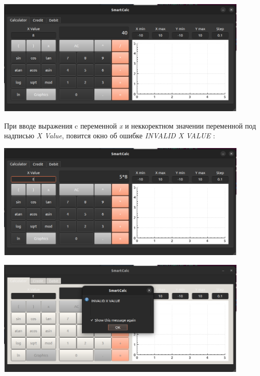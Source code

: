 \documentclass[12pt, letterpaper, twoside]{article}
\begin{document}
	\par \includegraphics[width=12cm]{9}
	
	\par При вводе выражения c переменной \textit{x} и неккоректном значении переменной под надписью \textit{X Value}, повится окно об ошибке \textit{INVALID X VALUE} :
	\par \includegraphics[width=12cm]{10}
	\par \includegraphics[width=12cm]{11}
	
\end{document}

